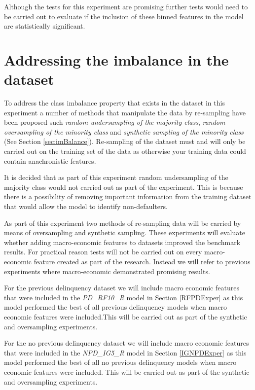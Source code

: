 Although the tests for this experiment are promising further tests would need to be carried out to evaluate if the inclusion of these binned features in the model are statistically significant. 

\section{Addressing the imbalance in the dataset}
To address the class imbalance property that exists in the dataset in this experiment a number of methods that manipulate the data by re-sampling have been proposed such \textit{random undersampling of the majority class}, \textit{random oversampling of the minority class} and \textit{synthetic sampling of the minority class} (See Section \ref{sec:imBalance}). Re-sampling of the dataset must and will only be carried out on the training set of the data as otherwise your training data could contain anachronistic features.

It is decided that as part of this experiment random undersampling of the majority class would not carried out as part of the experiment. This is because there is a possibility of removing important information from the training dataset that would allow the model to identify non-defaulters.

As part of this experiment two methods of re-sampling data will be carried by means of oversampling and synthetic sampling. These experiments will evaluate whether adding macro-economic features to datasets improved the benchmark results. For practical reason tests will not be carried out on every macro-economic feature created as part of the research. Instead we will refer to previous experiments where macro-economic demonstrated promising results. 

For the previous delinquency dataset we will include macro economic features that were included in the \textit{PD\_RF10\_R} model in Section \ref{RFPDExper} as this model performed the best of all previous delinquency models when macro economic features were included.This will be carried out as part of the synthetic and oversampling experiments.

For the no previous delinquency dataset we will include macro economic features that were included in the \textit{NPD\_IG5\_R} model in Section \ref{IGNPDExper} as this model performed the best of all no previous delinquency models when macro economic features were included. This will be carried out as part of the synthetic and oversampling experiments.

